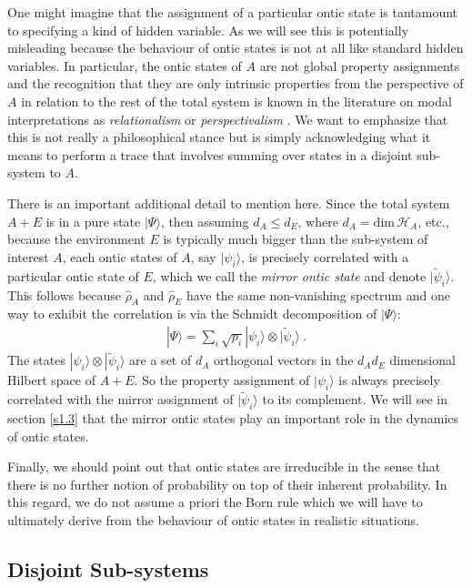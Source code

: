 \documentclass[%
preprint,
nofootinbib,
 amsmath,amssymb,
aps,
]{revtex4-1}
\def\BH{{\mathscr H}}
\def\ket#1{| #1\rangle}
\newcommand{\EQ}[1]{\begin{equation}\begin{split} #1
\end{split}\end{equation}}
\begin{document}
One might imagine that the assignment of a particular ontic state is tantamount to specifying a kind of hidden variable. As we will see this is potentially misleading because the behaviour of ontic states is not at all like standard hidden variables. In particular, the ontic states of $A$ are not global property assignments and the recognition that they are only intrinsic properties from the perspective of $A$ in relation to the rest of the total system
is known in the literature on modal interpretations as {\it relationalism\/} or {\it perspectivalism\/} \cite{BH,Rov,Dk1,BD1}. We want to emphasize that this is not really a philosophical stance but is 
simply acknowledging what it means to perform a trace that involves summing over states in a disjoint sub-system to $A$.

There is an important additional detail to mention here. 
Since the total system $A+E$ is in a pure state $\ket{\Psi}$, then assuming $d_A\leq d_E$, where $d_A=\text{dim}\,\BH_A$, etc., because 
the environment $E$ is typically much bigger than the sub-system of interest $A$, 
each ontic states of $A$, say $\ket{\psi_i}$, is precisely correlated with a particular ontic state of $E$, which we call the {\it mirror ontic state\/} and denote $\ket{\tilde\psi_i}$. This follows because 
$\hat\rho_A$ and $\hat\rho_E$ have the same non-vanishing spectrum and one way to exhibit the correlation is via the Schmidt decomposition of $\ket{\Psi}$:
\EQ{
\ket{\Psi}=\sum_i\sqrt{p_i}\ket{\psi_i}\otimes\ket{\tilde\psi_i}\ .
\label{m34}
}
The states $\ket{\psi_i}\otimes\ket{\tilde\psi_i}$ are a set of $d_A$ orthogonal vectors in the $d_Ad_E$ dimensional Hilbert space of $A+E$. So the property assignment of $\ket{\psi_i}$ is always precisely correlated with the mirror assignment of $\ket{\tilde\psi_i}$ to its complement. We will see in section \ref{s1.3} that the mirror ontic states play an important role in the dynamics of ontic states.

Finally, we should point out that ontic states are irreducible in the sense that there is no further notion of probability on top of their inherent probability. In this regard, we do not assume a priori the Born rule which we will have to ultimately derive from the behaviour of ontic states in realistic situations.

\subsection{Disjoint Sub-systems}\label{s1.12}
\end{document}
